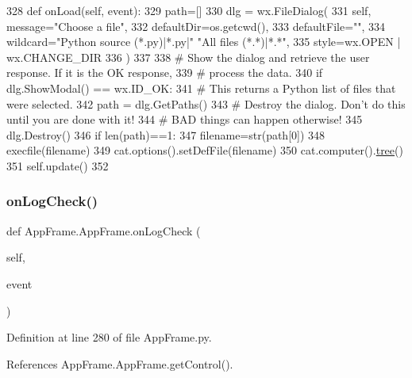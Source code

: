 \begin{DoxyCode}
328     \textcolor{keyword}{def }onLoad(self, event):
329         path=[]
330         dlg = wx.FileDialog(
331             self, message=\textcolor{stringliteral}{"Choose a file"},
332             defaultDir=os.getcwd(), 
333             defaultFile=\textcolor{stringliteral}{""},
334             wildcard=\textcolor{stringliteral}{"Python source (*.py)|*.py|"} \textcolor{stringliteral}{"All files (*.*)|*.*"},
335             style=wx.OPEN | wx.CHANGE\_DIR
336             )
337 
338         \textcolor{comment}{# Show the dialog and retrieve the user response. If it is the OK response, }
339         \textcolor{comment}{# process the data.}
340         \textcolor{keywordflow}{if} dlg.ShowModal() == wx.ID\_OK:
341             \textcolor{comment}{# This returns a Python list of files that were selected.}
342             path = dlg.GetPaths()
343         \textcolor{comment}{# Destroy the dialog. Don't do this until you are done with it!}
344         \textcolor{comment}{# BAD things can happen otherwise!}
345         dlg.Destroy()
346         \textcolor{keywordflow}{if} len(path)==1:
347             filename=str(path[0])
348             execfile(filename)
349             cat.options().setDefFile(filename)
350             cat.computer().\hyperlink{namespacetree}{tree}()
351             self.update()
352             
\end{DoxyCode}
\mbox{\label{classAppFrame_1_1AppFrame_a35ce110eb56fd0867d2690889c6e5a35}} 
\subsubsection{\texorpdfstring{on\+Log\+Check()}{onLogCheck()}}
{\footnotesize\ttfamily def App\+Frame.\+App\+Frame.\+on\+Log\+Check (\begin{DoxyParamCaption}\item[{}]{self,  }\item[{}]{event }\end{DoxyParamCaption})}



Definition at line 280 of file App\+Frame.\+py.



References App\+Frame.\+App\+Frame.\+get\+Control().


